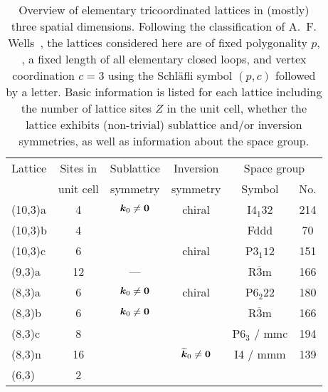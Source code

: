 \begin{table}[tb]
	\centering
	\begin{tabular*}{\linewidth}{l|@{\extracolsep{\fill}}ccccc}
		Lattice 	& Sites in  & Sublattice          & Inversion                 & \multicolumn{2}{c}{Space group} \\
		& unit cell & symmetry  & symmetry            & Symbol               	  & No.      \\
		\hline\hline
		(10,3)a 	& 4         & $\bm{k}_0 \neq \bm{0}$ & chiral                    & I$4_1 32$            & 214      \\
		(10,3)b 	& 4         & \checkmark          & \checkmark                & Fddd                 & 70       \\
		(10,3)c 	& 6         & \checkmark          & chiral                    & P$3_1 12$            & 151      \\
		\hline
		(9,3)a  	& 12        & ---                 & \checkmark                & R$\overline{3}$m     & 166      \\
		\hline
		(8,3)a  	& 6         & $\bm{k}_0 \neq \bm{0}$ & chiral                    & P$6_2 22$            & 180      \\
		(8,3)b  	& 6         & $\bm{k}_0 \neq \bm{0}$ & \checkmark                & R$\overline{3}$m     & 166      \\
		(8,3)c  	& 8         & \checkmark          & \checkmark                & P$6_3$ / mmc         & 194      \\
		(8,3)n  	& 16        & \checkmark          & $\widetilde{\bm{k}}_0 \neq \bm{0}$ & I4 / mmm             & 139      \\
		\hline
		(6,3)   	& 2         & \checkmark          & \checkmark                &                      &         
	\end{tabular*}
	\caption{
		Overview of elementary tricoordinated lattices in (mostly) three spatial dimensions.
		Following the classification of A.~F. Wells~\cite{Wells1977}, the lattices considered here are of fixed polygonality $p$, \ie, a fixed length of all elementary closed loops, and vertex coordination $c=3$ using the Schl\"afli symbol $(p,c)$ followed by a letter.
		Basic information is listed for each lattice including the number of lattice sites $Z$ in the unit cell, whether the lattice exhibits (non-trivial) sublattice and/or inversion symmetries, as well as information about the space group.
	}
	\label{table:chapter05_LatticeOverview}
\end{table}
%


%
%
